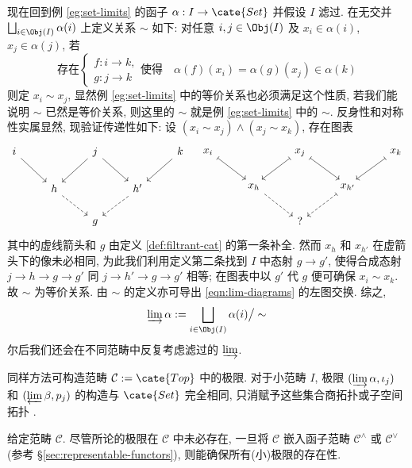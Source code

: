 现在回到例 \ref{eg:set-limits} 的函子 $\alpha: I \to \cate{Set}$ 并假设 $I$ 滤过. 在无交并 $\bigsqcup_{i \in \Obj(I)} \alpha(i)$ 上定义关系 $\sim$ 如下: 对任意 $i, j \in \Obj(I)$ 及 $x_i \in \alpha(i)$, $x_j \in \alpha(j)$, 若
\begin{equation}\label{eqn:filtrant-equiv} \text{存在} \begin{cases}
	f: i \to k, \\
	g: j \to k
	\end{cases}
	\text{使得} \quad \alpha(f)(x_i) = \alpha(g)(x_j) \in \alpha(k)
\end{equation}
则定 $x_i \sim x_j$, 显然例 \ref{eg:set-limits} 中的等价关系也必须满足这个性质, 若我们能说明 $\sim$ 已然是等价关系, 则这里的 $\sim$ 就是例 \ref{eg:set-limits} 中的 $\sim$. 反身性和对称性实属显然, 现验证传递性如下: 设 $(x_i \sim x_j) \wedge (x_j \sim x_k)$, 存在图表
\[ \begin{tikzcd}[scale=0.75]
	i \arrow[rd] & & j \arrow[ld] \arrow[rd] & & k \arrow[ld] \\
	& h \arrow[dashed, rd] & & h' \arrow[dashed, ld] & \\
	& & g & &
\end{tikzcd} \quad \begin{tikzcd}[scale=0.75]
	x_i \arrow[mapsto, rd] & & x_j \arrow[mapsto, ld] \arrow[mapsto, rd] & & x_k \arrow[mapsto, ld] \\
	& x_h \arrow[dashed, rd] & & x_{h'} \arrow[dashed, mapsto, ld] & \\
	& & ? & & 
\end{tikzcd} \]
其中的虚线箭头和 $g$ 由定义 \ref{def:filtrant-cat} 的第一条补全. 然而 $x_h$ 和 $x_{h'}$ 在虚箭头下的像未必相同, 为此我们利用定义第二条找到 $I$ 中态射 $g \to g'$, 使得合成态射 $j \to h \to g \to g'$ 同 $j \to h' \to g \to g'$ 相等; 在图表中以 $g'$ 代 $g$ 便可确保 $x_i \sim x_k$. 故 $\sim$ 为等价关系. 由 $\sim$ 的定义亦可导出 \eqref{eqn:lim-diagrams} 的左图交换. 综之,
\[ \varinjlim \alpha := \bigsqcup_{i \in \Obj(I)} \alpha(i) \big/ \sim \]
尔后我们还会在不同范畴中反复考虑滤过的 $\varinjlim$.

\begin{example}\label{eg:top-limits}
	同样方法可构造范畴 $\mathcal{C} := \cate{Top}$ 中的极限. 对于小范畴 $I$, 极限 $(\varinjlim \alpha, \iota_j)$ 和 $(\varprojlim \beta, p_j)$ 的构造与 $\cate{Set}$ 完全相同, 只消赋予这些集合商拓扑或子空间拓扑 \cite[\S 3.1, \S 3.4]{Xiong}.
\end{example}

给定范畴 $\mathcal{C}$. 尽管所论的极限在 $\mathcal{C}$ 中未必存在, 一旦将 $\mathcal{C}$ 嵌入函子范畴 $\mathcal{C}^\wedge$ 或 $\mathcal{C}^\vee$ (参考 \S\ref{sec:representable-functors}), 则能确保所有(小)极限的存在性.

